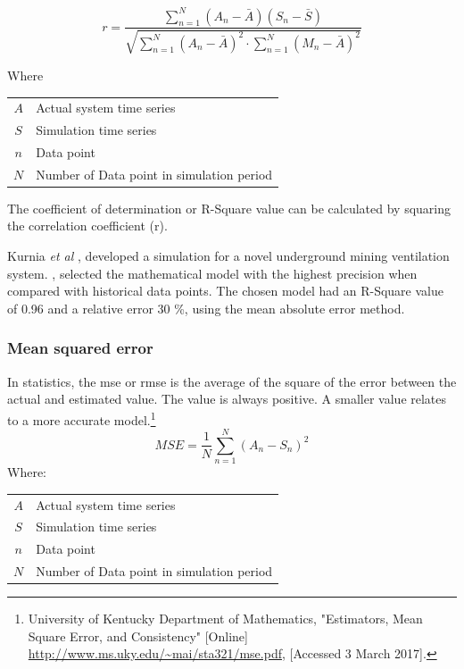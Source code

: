 		\begin{equation}
 		\label{eq: Correlation coefficient}
 		r = \dfrac{\sum_{n=1}^{N}(A_n - \bar{A})(S_n - \bar{S})}{\sqrt{\sum_{n=1}^{N}(A_n - \bar{A})^2 \cdot \sum_{n=1}^{N}(M_n - \bar{A})^2}}
 		\end{equation}
 		\par
 		Where \par
 		\begin{table}[h!]
 			\centering
 			\begin{tabular}{cl}
 				$A$ & Actual system time series \\
 				$S$ & Simulation time series \\
 				$n$ & Data point \\
 				$N$ & Number of Data point in simulation period \\
 			\end{tabular} 
 		\end{table}	
 		The coefficient of determination or R-Square value can be calculated by squaring the correlation coefficient (r). 
 		\par 
 			Kurnia \textit{et al} \cite{kurnia2014simulation},\cite{kurnia2014dust} developed a simulation for a novel underground mining ventilation system. \cite{kurnia2014simulation},\cite{kurnia2014dust} selected the mathematical model with the highest precision when compared with historical data points. The chosen model had an R-Square value of 0.96 and a relative error 30 \%, using the mean absolute error method. 
 			
 		\subsubsection{Mean squared error}	
 		In statistics, the \gls{mse} or \gls{rmse} is the average of the square of the error between the actual and estimated value. The value is always positive. A smaller value relates to a more accurate model.\footnote{University of Kentucky Department of Mathematics, "Estimators, Mean Square Error, and
 			Consistency" [Online] \url{http://www.ms.uky.edu/~mai/sta321/mse.pdf}, [Accessed 3 March 2017].}
 			\begin{equation}
 				\label{eq: rmse}
 				MSE = \dfrac{1}{N}\sum_{n=1}^{N}{(A_{n} - S_{n})^2}
 			\end{equation}
 			Where: \par
 			\begin{table}[h!]
 				\centering
 				\begin{tabular}{cl}
 					$A$ & Actual system time series \\
 					$S$ & Simulation time series \\
 					$n$ & Data point \\
 					$N$ & Number of Data point in simulation period \\
 			\end{tabular} 
 			\end{table}	
